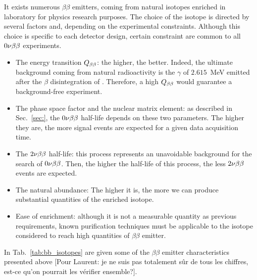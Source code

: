 It exists numerous $\beta\beta$ emitters, coming from natural isotopes enriched in laboratory for physics research purposes.
The choice of the isotope is directed by several factors and, depending on the experimental constraints.
Although this choice is specific to each detector design, certain constraint are common to all $0\nu\beta\beta$ experiments.
\begin{itemize}
\item The energy transition $Q_{\beta\beta}$: the higher, the better.
Indeed, the ultimate background coming from natural radioactivity is the $\gamma$ of $2.615$~MeV emitted after the $\beta$ disintegration of \Tl.
Therefore, a high $Q_{\beta\beta}$ would guarantee a background-free experiment.
\item The phase space factor and the nuclear matrix element: as described in Sec.~\ref{sec:}, the $0\nu\beta\beta$ half-life depends on these two parameters.
The higher they are, the more signal events are expected for a given data acquisition time.
\item The $2\nu\beta\beta$ half-life: this process represents an unavoidable background for the search of $0\nu\beta\beta$.
Then, the higher the half-life of this process, the less $2\nu\beta\beta$ events are expected.
\item The natural abundance: The higher it is, the more we can produce substantial quantities of the enriched isotope.
\item Ease of enrichment: although it is not a measurable quantity as previous requirements, known purification techniques must be applicable to the isotope considered to reach high quantities of $\beta\beta$ emitter.
\end{itemize}
In Tab.~\ref{tab:bb_isotopes} are given some of the $\beta\beta$ emitter characteristics presented above [Pour Laurent: je ne suis pas totalement sûr de tous les chiffres, est-ce qu'on pourrait les vérifier ensemble?].
